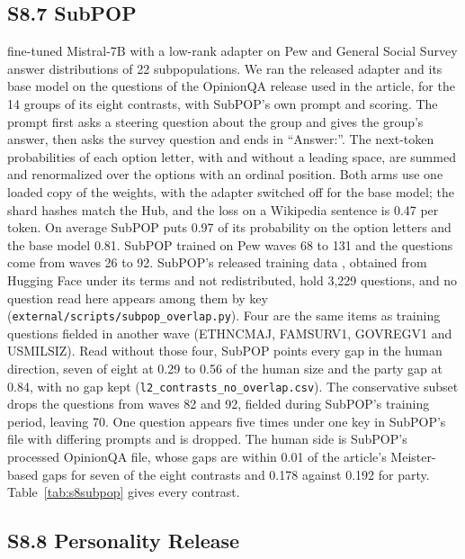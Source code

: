\subsection*{S8.7 SubPOP}

\citet{suh2025subpop} fine-tuned Mistral-7B \citep{jiang2023mistral} with a low-rank adapter on Pew and General Social Survey answer distributions of 22 subpopulations.
We ran the released adapter and its base model on the questions of the OpinionQA release used in the article, for the 14 groups of its eight contrasts, with SubPOP's own prompt and scoring.
The prompt first asks a steering question about the group and gives the group's answer, then asks the survey question and ends in ``Answer:''.
The next-token probabilities of each option letter, with and without a leading space, are summed and renormalized over the options with an ordinal position.
Both arms use one loaded copy of the weights, with the adapter switched off for the base model; the shard hashes match the Hub, and the loss on a Wikipedia sentence is 0.47 per token.
On average SubPOP puts 0.97 of its probability on the option letters and the base model 0.81.
SubPOP trained on Pew waves 68 to 131 and the questions come from waves 26 to 92.
SubPOP's released training data \citep{suh2025subpop}, obtained from Hugging Face under its terms and not redistributed, hold 3,229 questions, and no question read here appears among them by key (\texttt{external/scripts/subpop\_overlap.py}).
Four are the same items as training questions fielded in another wave (ETHNCMAJ, FAMSURV1, GOVREGV1 and USMILSIZ).
Read without those four, SubPOP points every gap in the human direction, seven of eight at 0.29 to 0.56 of the human size and the party gap at 0.84, with no gap kept (\texttt{l2\_contrasts\_no\_overlap.csv}).
The conservative subset drops the questions from waves 82 and 92, fielded during SubPOP's training period, leaving 70.
One question appears five times under one key in SubPOP's file with differing prompts and is dropped.
The human side is SubPOP's processed OpinionQA file, whose gaps are within 0.01 of the article's Meister-based gaps for seven of the eight contrasts and 0.178 against 0.192 for party.
Table~\ref{tab:s8subpop} gives every contrast.



\subsection*{S8.8 Personality Release}

